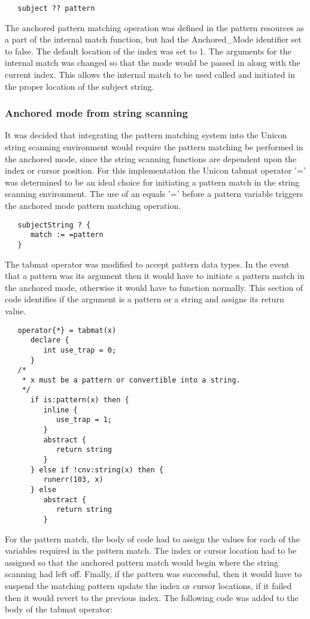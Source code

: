 \documentclass{article}
\begin{document}
\begin{verbatim}
   subject ?? pattern
\end{verbatim}

The anchored pattern matching operation was defined in the pattern resources as a part of the internal match function, but had the Anchored\_Mode identifier set to false.  The default location of the index was set to 1.  The arguments for the internal match was changed so that the mode would be passed in along with the current index.  This allows the internal match to be used called and initiated in the proper location of the subject string.

\subsubsection{Anchored mode from string scanning}
It was decided that integrating the pattern matching system into the Unicon string scanning environment would require the pattern matching be performed in the anchored mode, since the string scanning functions are dependent upon the index or cursor position.  For this implementation the Unicon tabmat operator '=' was determined to be an ideal choice for initiating a pattern match in the string scanning environment.  The use of an equals '=' before a pattern variable triggers the anchored mode pattern matching operation.
 
\begin{verbatim}
   subjectString ? {
      match := =pattern
   }
\end{verbatim}

The tabmat operator was modified to accept pattern data types.  In the event that a pattern was its argument then it would have to initiate a pattern match in the anchored mode, otherwise it would have to function normally.  This section of code identifies if the argument is a pattern or a string and assigns its return value.

\begin{verbatim}
   operator{*} = tabmat(x)
      declare {
         int use_trap = 0;
      }
   /*
    * x must be a pattern or convertible into a string.
    */
      if is:pattern(x) then {
         inline {
            use_trap = 1;
         }
         abstract {
            return string
         }
      } else if !cnv:string(x) then {
         runerr(103, x)
      } else 
         abstract {
            return string
         }
\end{verbatim}

For the pattern match, the body of code had to assign the values for each of the variables required in the pattern match.  The index or cursor location had to be assigned so that the anchored pattern match would begin where the string scanning had left off.  Finally, if the pattern was successful, then it would have to suspend the matching pattern update the index or cursor locations, if it failed then it would revert to the previous index.  The following code was added to the body of the tabmat operator:
\end{document}
